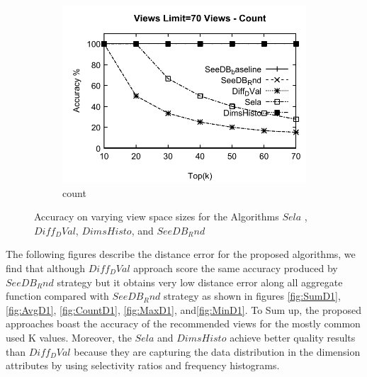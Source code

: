 \begin{figure}[h]
\begin{subfigure}[b]{0.32\textwidth}
    \includegraphics[width=\textwidth]{CountA1.pdf}
     \caption{count  }
        \label{fig:CountA1}
  \end{subfigure}
  \caption{Accuracy on varying view space sizes for the Algorithms $Sela$ ,$Diff_DVal$, $DimsHisto$, and $SeeDB_Rnd$}
\end{figure}

The following figures describe the distance error for the proposed algorithms, we find that although $Diff_DVal$ approach score the same accuracy produced by $SeeDB_Rnd$ strategy but it obtains very low distance error along all aggregate function compared with $SeeDB_Rnd$ strategy as shown in figures \ref{fig:SumD1}, \ref{fig:AvgD1}, \ref{fig:CountD1}, \ref{fig:MaxD1}, and\ref{fig:MinD1}. To Sum up, the proposed approaches boast the accuracy of the recommended views for the mostly common used K values. Moreover, the $Sela$ and $DimsHisto$ achieve better quality results than $Diff_DVal$  because they are capturing the data distribution in the dimension attributes by using selectivity ratios and frequency histograms.
 
